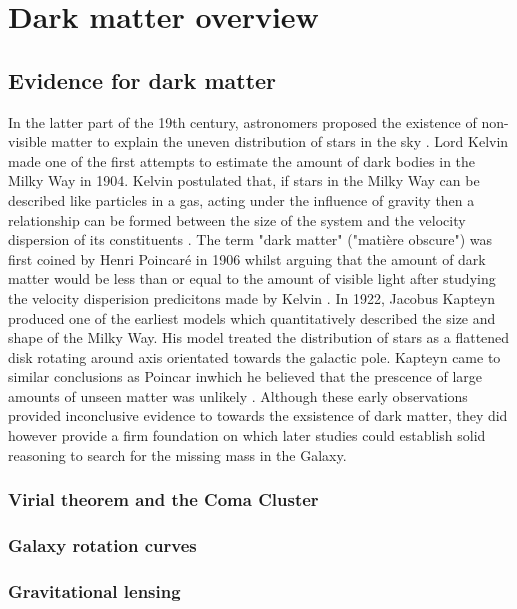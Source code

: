 \chapter{Dark matter overview}\label{chap:DarkMatterOverview}
\section{Evidence for dark matter}\label{sec:DMOverview/Evidence4DM}
In the latter part of the 19th century, astronomers proposed the existence of non-visible matter to explain the uneven distribution of stars in the sky \cite{HistoryofDM}.
Lord Kelvin made one of the first attempts to estimate the amount of dark bodies in the Milky Way in 1904.
Kelvin postulated that, if stars in the Milky Way can be described like particles in a gas, acting under the influence of gravity then a relationship can be formed between the size of the system and the velocity dispersion of its constituents \cite{Kelvin1904}.
The term "dark matter" ("matière obscure") was first coined by Henri Poincar\'e in 1906 whilst arguing that the amount of dark matter would be less than or equal to the amount of visible light after studying the velocity disperision predicitons made by Kelvin \cite{HPon}.
In 1922, Jacobus Kapteyn produced one of the earliest models which quantitatively described the size and shape of the Milky Way. 
His model treated the distribution of stars as a flattened disk rotating around axis orientated towards the galactic pole.
Kapteyn came to similar conclusions as Poincar inwhich he believed that the prescence of large amounts of unseen matter was unlikely \cite{Kapteyn1922}.
Although these early observations provided inconclusive evidence to towards the exsistence of dark matter, they did however provide a firm foundation on which later studies could establish solid reasoning to search for the missing mass in the Galaxy.

\subsection{Virial theorem and the Coma Cluster}\label{sec:DMOverview/ViralTheorem}

\subsection{Galaxy rotation curves}\label{sec:DMOverview/RotationCurves}

\subsection{Gravitational lensing}\label{sec:DMOverview/GravLens}

